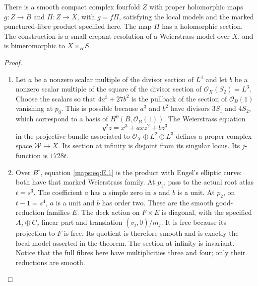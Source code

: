 \begin{theorem}\label{maps:src:E.1.2}


There is a smooth compact complex fourfold $Z$ with proper holomorphic
maps $g:Z\to B$ and $\Pi:Z\to X$, with $g=f\Pi$, satisfying the local
models and the marked punctured-fibre product specified here.  The map $\Pi$
has a holomorphic section.  The construction is a small crepant
resolution of a Weierstrass model over $X$, and is bimeromorphic to
$X\times_B S$.

\end{theorem}


\begin{proof}
\begin{enumerate}[label=\arabic*.,leftmargin=*]
\item Let $a$ be a nonzero scalar multiple of the divisor section of $L^4$
and let $b$ be a nonzero scalar multiple of the square of the divisor
section of $\mathcal O_X(S_2)=L^3$.  Choose the scalars so that
$4a^3+27b^2$ is the pullback of the section of $\mathcal O_B(1)$
vanishing at $p_0$.  This is possible because $a^3$ and $b^2$ have
divisors $3S_1$ and $4S_2$, which correspond to a basis of
$H^0(B,\mathcal O_B(1))$.  The Weierstrass equation
\[
 y^2z=x^3+axz^2+bz^3
 \tag{E.1}\label{maps:eq:E.1}
\]
in the projective bundle associated to
$\mathcal O_X\oplus L^2\oplus L^3$ defines a proper complex space
$\mathscr W\to X$.  Its section at infinity is disjoint from its
singular locus.  Its $j$-function is $1728t$.

\item Over $B^\circ$, equation \eqref{maps:eq:E.1} is the product with Engel's elliptic
curve: both have that marked Weierstrass family.  At $p_1$, pass to the
actual root atlas $t=s^3$.  The coefficient $a$ has a simple zero in $s$
and $b$ is a unit.  At $p_2$, on $t-1=s^4$, $a$ is a unit and $b$ has
order two.  These are the smooth good-reduction families $E$.
The deck action on $F\times E$ is diagonal, with the specified
$A_j\oplus C_j$ linear part and translation $(v_j,0)/m_j$.
It is free because its projection to $F$ is free.  Its quotient is
therefore smooth and is exactly the local model asserted in the theorem.
The section at infinity is invariant.  Notice that the full fibres here
have multiplicities three and four; only their reductions are smooth.


\end{enumerate}
\end{proof}
